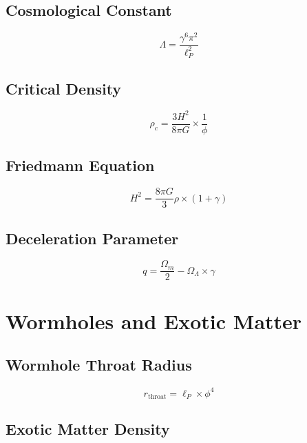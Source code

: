 \documentclass[12pt,a4paper]{article}
\begin{document}
\subsection{Cosmological Constant}

\begin{equation}
\Lambda = \frac{\gamma^6 \pi^2}{\ell_P^2}
\end{equation}

\subsection{Critical Density}

\begin{equation}
\rho_c = \frac{3H^2}{8\pi G} \times \frac{1}{\phi}
\end{equation}

\subsection{Friedmann Equation}

\begin{equation}
H^2 = \frac{8\pi G}{3}\rho \times (1 + \gamma)
\end{equation}

\subsection{Deceleration Parameter}

\begin{equation}
q = \frac{\Omega_m}{2} - \Omega_\Lambda \times \gamma
\end{equation}

\section{Wormholes and Exotic Matter}

\subsection{Wormhole Throat Radius}

\begin{equation}
r_{\text{throat}} = \ell_P \times \phi^4
\end{equation}

\subsection{Exotic Matter Density}
\end{document}
